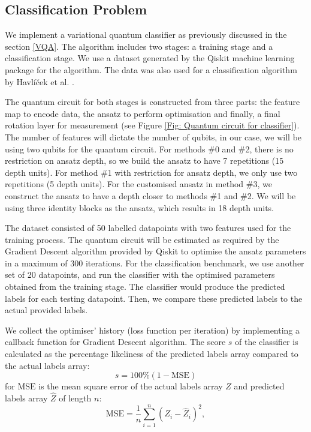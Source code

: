 \subsection{Classification Problem} \label{Sec: Classification Problem}
We implement a variational quantum classifier as previously discussed in the section \ref{VQA}.
The algorithm includes two stages: a training stage and a classification stage.
We use a dataset generated by the Qiskit machine learning package for the algorithm.
The data was also used for a classification algorithm by Havlíček et al. \cite{havlicekSupervisedLearningQuantumenhanced2019}.

The quantum circuit for both stages is constructed from three parts: the feature map to encode data, the ansatz to perform optimisation and finally, a final rotation layer for measurement (see Figure \ref{Fig: Quantum circuit for classifier}).
The number of features will dictate the number of qubits, in our case, we will be using two qubits for the quantum circuit.
For methods \#0 and \#2, there is no restriction on ansatz depth, so we build the ansatz to have 7 repetitions (15 depth units).
For method \#1 with restriction for ansatz depth, we only use two repetitions (5 depth units).
For the customised ansatz in method \#3, we construct the ansatz to have a depth closer to methods \#1 and \#2. We will be using three identity blocks as the ansatz, which results in 18 depth units.

The dataset consisted of 50 labelled datapoints with two features used for the training process.
The quantum circuit will be estimated as required by the Gradient Descent algorithm provided by Qiskit to optimise the ansatz parameters in a maximum of 300 iterations.
For the classification benchmark, we use another set of 20 datapoints, and run the classifier with the optimised parameters obtained from the training stage.
The classifier would produce the predicted labels for each testing datapoint.
Then, we compare these predicted labels to the actual provided labels.

We collect the optimiser' history (loss function per iteration) by implementing a callback function for Gradient Descent algorithm.
The score $s$ of the classifier is calculated as the percentage likeliness of the predicted labels array compared to the actual labels array:
\begin{equation}
    s = 100\% (1 - \text{MSE})
\end{equation}
for $\text{MSE}$ is the mean square error of the actual labels array $Z$ and predicted labels array $\hat{Z}$ of length $n$:
\begin{equation}
    \text{MSE} = \frac{1}{n}\sum^n_{i=1}(Z_i - \hat{Z}_i)^2,
\end{equation}



